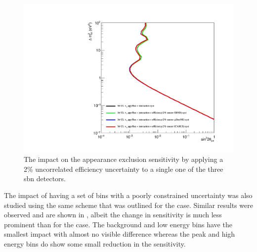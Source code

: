 \begin{figure}[h!]
    \centering
    \includegraphics[width = \largefigwidth]{figures-chap6/exclusion_contours/efficiency_systematics/nue_app_2pct_uncor_per_detector.pdf}
    \caption[\nue app with a 2\% uncorrelated efficiency systematic for one detector only.]{The impact on the \nue appearance exclusion sensitivity by applying a 2\% uncorrelated efficiency uncertainty to a single one of the three \gls{sbn} detectors.}
    \label{fig:nue_app_uncorrelated_per_detector}
\end{figure}

The impact of having a set of bins with a poorly constrained uncertainty was also studied using the same scheme that was outlined for the \numu case. Similar results were observed and are shown in , albeit the change in sensitivity is much less prominent than for the \numu case. The background and low energy bins have the smallest impact with almost no visible difference whereas the peak and high energy bins do show some small reduction in the sensitivity. 


